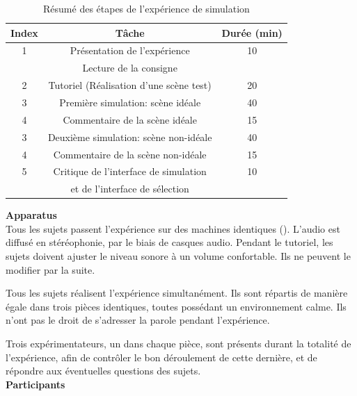 \begin{table}[t]
\centering
\begin{tabular}{c c c} 
Index          & Tâche                               & Durée (min) \\                      
\hline
1 & Présentation de l'expérience                     & 10 \\
  & Lecture de la consigne                           &  \\
\hline
2 & Tutoriel (Réalisation d'une scène test)          & 20 \\
\hline
3 & Première simulation: scène idéale                & 40 \\
\hline
4  & Commentaire de la scène idéale                  & 15 \\
\hline
3 & Deuxième simulation: scène non-idéale            & 40  \\
\hline
4  & Commentaire de la scène non-idéale              & 15 \\
\hline
5 & Critique de l'interface de simulation            & 10 \\
  & et de l'interface de sélection                   & \\
\hline
\end{tabular}
\vspace{0.5mm}
\caption{Résumé des étapes de l’expérience de simulation}
\label{tab:indSimu}
\end{table}

\textbf{Apparatus} \\

Tous les sujets passent l'expérience sur des machines identiques (). L'audio est diffusé en stéréophonie, par le biais de casques audio. Pendant le tutoriel, les sujets doivent ajuster le niveau sonore à un volume confortable. Ils ne peuvent le modifier par la suite.

Tous les sujets réalisent l'expérience simultanément. Ils sont répartis de manière égale dans trois pièces identiques, toutes possédant un environnement calme. Ils n'ont pas le droit de s'adresser la parole pendant l'expérience.

Trois expérimentateurs, un dans chaque pièce, sont présents durant la totalité de l'expérience, afin de contrôler le bon déroulement de cette dernière, et de répondre aux éventuelles questions des sujets.  \\

\textbf{Participants} \\

